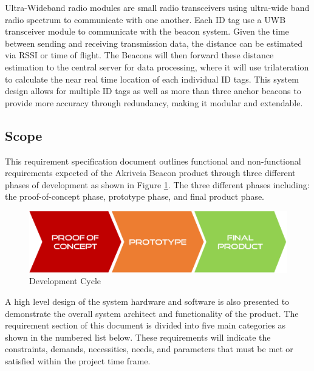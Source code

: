 \bigskip
Ultra-Wideband radio modules are small radio transceivers using ultra-wide band radio spectrum to communicate with one another. Each ID tag use a UWB transceiver module to communicate with the beacon system. Given the time between sending and receiving transmission data, the distance can be estimated via \Gls{RSSI} or time of flight. The Beacons will then forward these distance estimation to the central server for data processing, where it will use trilateration to calculate the near real time location of each individual ID tags. This system design allows for multiple ID tags as well as more than three anchor beacons to provide more accuracy through redundancy, making it modular and extendable.

\break

\subsection{Scope}
This requirement specification document outlines functional and non-functional requirements expected of the Akriveia Beacon product through three different phases of development as shown in Figure \ref{dev}. The three different phases including: the proof-of-concept phase, prototype phase, and final product phase.
\medskip

\begin{figure}[H]
\centering
    \includegraphics[scale=0.4]{./images/dev-path.png}
    \caption{Development Cycle}
    \label{dev}
\end{figure}

A high level design of the system hardware and software is also presented to demonstrate the overall system architect and functionality of the product. The requirement section of this document is divided into five main categories as shown in the numbered list below. These requirements will indicate the constraints, demands, necessities, needs, and parameters that must be met or satisfied within the project time frame.

